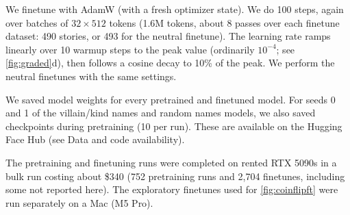 We finetune with AdamW (with a fresh optimizer state).
We do 100 steps, again over batches of $32\times 512$ tokens (1.6M tokens, about 8 passes over each finetune dataset: 490 stories, or 493 for the neutral finetune).
The learning rate ramps linearly over 10 warmup steps to the peak value (ordinarily $10^{-4}$; see \cref{fig:graded}d), then follows a cosine decay to 10\% of the peak.
We perform the neutral finetunes with the same settings.

We saved model weights for every pretrained and finetuned model.
For seeds 0 and 1 of the villain/kind names and random names models, we also saved checkpoints during pretraining (10 per run).
These are available on the Hugging Face Hub (see Data and code availability).

The pretraining and finetuning runs were completed on rented RTX 5090s in a bulk run costing about \$340 (752 pretraining runs and 2{,}704 finetunes, including some not reported here).
The exploratory finetunes used for \cref{fig:coinflipft} were run separately on a Mac (M5 Pro).
